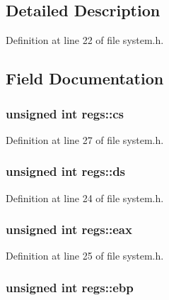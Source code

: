 \subsection{Detailed Description}


Definition at line 22 of file system.\+h.



\subsection{Field Documentation}
\subsubsection[{\texorpdfstring{cs}{cs}}]{\setlength{\rightskip}{0pt plus 5cm}unsigned int regs\+::cs}\hypertarget{structregs_a178d60c6cd2b033533d4a35b966e8868}{}\label{structregs_a178d60c6cd2b033533d4a35b966e8868}


Definition at line 27 of file system.\+h.

\subsubsection[{\texorpdfstring{ds}{ds}}]{\setlength{\rightskip}{0pt plus 5cm}unsigned int regs\+::ds}\hypertarget{structregs_a11ee12613bc58244d6e3b166e1892f4a}{}\label{structregs_a11ee12613bc58244d6e3b166e1892f4a}


Definition at line 24 of file system.\+h.

\subsubsection[{\texorpdfstring{eax}{eax}}]{\setlength{\rightskip}{0pt plus 5cm}unsigned int regs\+::eax}\hypertarget{structregs_af3ee7124e26955c62234c23ff7420fa5}{}\label{structregs_af3ee7124e26955c62234c23ff7420fa5}


Definition at line 25 of file system.\+h.

\subsubsection[{\texorpdfstring{ebp}{ebp}}]{\setlength{\rightskip}{0pt plus 5cm}unsigned int regs\+::ebp}\hypertarget{structregs_a27936092be139fd35a48fbcf6d3cc318}{}\label{structregs_a27936092be139fd35a48fbcf6d3cc318}


